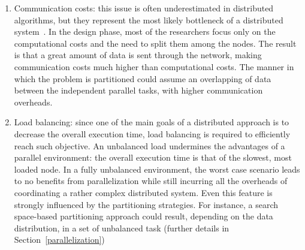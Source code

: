 \begin{enumerate}

\item Communication costs: this issue is often underestimated in distributed
algorithms, but they represent the most likely bottleneck of a distributed
system~\cite{sarma2013upper}. In the design phase, most of the researchers focus
only on the computational costs and the need to split them among the nodes. The
result is that a great amount of data is sent through the network, making
communication costs much higher than computational costs. The manner in which the problem is partitioned could assume an overlapping of data between the independent parallel tasks, with higher communication overheads.

\item Load balancing: since one of the main goals of a distributed
approach is to decrease the overall execution time, load balancing is required
to efficiently reach such objective. An unbalanced load
undermines the advantages of a parallel environment: the overall execution time
is that of the slowest, most loaded node. In a fully unbalanced environment, the
worst case scenario leads to no benefits from parallelization while still
incurring all the overheads of coordinating a rather complex distributed system. Even this feature is strongly influenced by the partitioning strategies. For instance, a search space-based partitioning approach could result, depending on the data distribution, in a set of unbalanced task (further details in Section~\ref{parallelization})

\end{enumerate}


